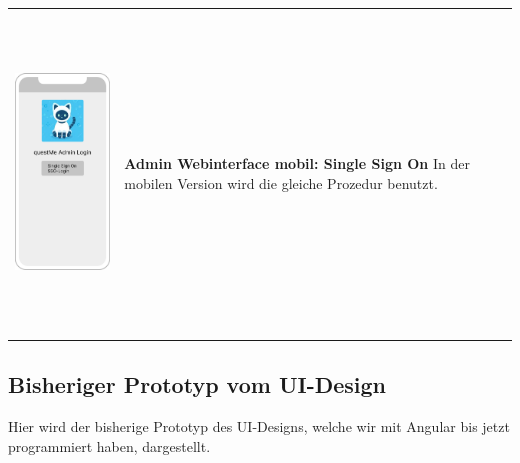 \begin{tabular}{C{6cm}  L{7cm}}
    \includegraphics[width=5cm,height=8.5cm]{bilder/new vers. UI Design/Login SSO/Interface SSO v1.2.png}               & \textbf{Admin Webinterface mobil: Single Sign On} \newline
    In der mobilen Version wird die gleiche Prozedur benutzt.
\end{tabular}

\newpage

\subsection{Bisheriger Prototyp vom UI-Design}
Hier wird der bisherige Prototyp des UI-Designs, 
welche wir mit Angular bis jetzt programmiert haben, dargestellt.
\\

